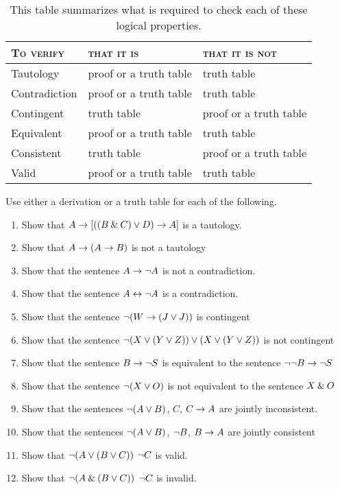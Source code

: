 \begin{table*}\centering\sffamily\footnotesize
{}
\begin{tabular}{@{}l l l@{}}\toprule
\textsc{To verify}			&	\textsc{that it is} &	\textsc{that it is not} \\\midrule
Tautology 		& proof or a truth table 							& truth table \\
Contradiction 	&  proof or a truth table  		 				& truth table\\ 
Contingent		& truth table 										& proof or a truth table\\
Equivalent 		& proof or a truth table 		 					& truth table\\
Consistent 		& truth table 										& proof or a truth table\\
Valid 				& proof or a truth table 							& truth table \\ 
\bottomrule
\end{tabular}
\caption{This table summarizes what is required to check each of these logical properties.}\label{table.proof-or-model}
\end{table*}




\practiceproblems
\noindent\problempart Use either a derivation or a truth table for each of the following. 
\begin{enumerate}%
\item Show that $A \rightarrow [((B \mathbin{\&} C) \vee D) \rightarrow A]$ is a tautology.
\item Show that $A \rightarrow (A \rightarrow B)$ is not a tautology
\item Show that the sentence $A \rightarrow {\neg}{A}$ is not a contradiction.
\item Show that the sentence $A \leftrightarrow {\neg} A$ is a contradiction. 
\item Show that the sentence $ {\neg} (W \rightarrow (J \vee J)) $ is contingent
\item Show that the sentence $ {\neg}(X \vee (Y \vee Z)) \vee (X \vee (Y \vee Z))$ is not contingent
 \item Show that the sentence $B \rightarrow {\neg} S$ is equivalent to the sentence ${\neg} {\neg} B \rightarrow {\neg} S$
\item Show that the sentence $ {\neg} (X \vee O) $ is not equivalent to the sentence $X \mathbin{\&} O$
\item Show that the sentences ${\neg}(A \vee B)$, $C$, $C \rightarrow A$  are jointly inconsistent.
\item Show that the sentences ${\neg}(A \vee B)$, ${\neg}{B}$, $B \rightarrow A$ are jointly consistent
\item Show that ${\neg}(A \vee (B \vee C)) $ \therefore $ {\neg}{C}$ is valid.
\item Show that ${\neg}(A \mathbin{\&} (B \vee C))$ \therefore $ {\neg}{C}$ is invalid. 
\end{enumerate}


